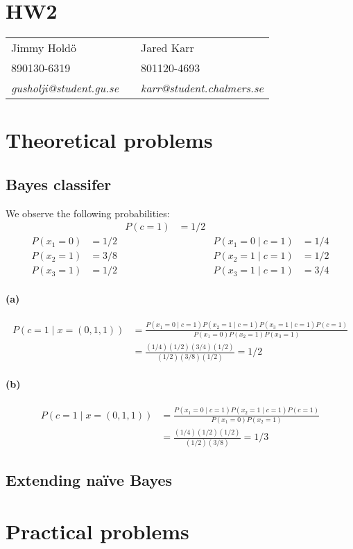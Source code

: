 \documentclass[a4paper,11pt]{article}
\DeclareMathOperator{\given}{\mid}
\begin{document}
\section*{HW2}

\begin{tabular*}{0.9\textwidth}{@{\extracolsep{\fill} } lll}
Jimmy Hold\"{o} & & Jared Karr\\
890130-6319 & & 801120-4693\\
\it{gusholji@student.gu.se} & & \it{karr@student.chalmers.se}\\
\end{tabular*}

\section{Theoretical problems}
\subsection{Bayes classifer}
We observe the following probabilities:
\begin{align*}
&&P(c=1)&=1/2 & &\\
P(x_1=0)&=1/2 &&& P(x_1=0\given c=1)&=1/4\\
P(x_2=1)&=3/8 &&& P(x_2=1\given c=1)&=1/2\\
P(x_3=1)&=1/2 &&& P(x_3=1\given c=1)&=3/4
\end{align*}

\paragraph{(a)}
\begin{align*}
  P(c=1\given x=(0, 1, 1))
  &=\frac{
    P(x_1=0\given c=1)
    P(x_2=1\given c=1)
    P(x_3=1\given c=1)
    P(c=1)
  }{
    P(x_1=0)
    P(x_2=1)
    P(x_3=1)
  }\\
  &=\frac{
    (1/4)(1/2)(3/4)(1/2)
  }{
    (1/2)(3/8)(1/2)
  }=1/2
\end{align*}

\paragraph{(b)}
\begin{align*}
  P(c=1\given x=(0, 1, 1))
  &=\frac{
    P(x_1=0\given c=1)
    P(x_2=1\given c=1)
    P(c=1)
  }{
    P(x_1=0)
    P(x_2=1)
  }\\
  &=\frac{
    (1/4)(1/2)(1/2)
  }{
    (1/2)(3/8)
  }=1/3
\end{align*}

\subsection{Extending na\"ive Bayes}
\section{Practical problems}
\subsection{}

\subsection{}
\end{document}
